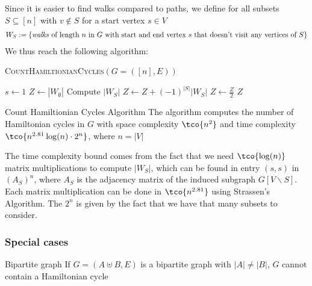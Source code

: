 Since it is easier to find walks compared to paths, we define for all subsets $S \subseteq [n]$ with $v \notin S$ for a start vertex $s \in V$
\begin{align*}
    W_S := \{ \text{\textit{walks} of length $n$ in $G$ with start and end vertex $s$ that doesn't visit any vertices of }S \}
\end{align*}
We thus reach the following algorithm:
\begin{algorithm}
    \caption{\textsc{CountHamiltionianCycles}$(G = ([n], E))$}
    \begin{algorithmic}[1]
        \State $s \gets 1$ 
        \State $Z \gets |W_{\emptyset}|$ 
            \State Compute $|W_S|$ 
            \State $Z \gets Z + (-1)^{|S|}|W_S|$ 
        \EndFor
        \State $Z \gets \frac{Z}{2}$ 
        \State \Return $Z$ 
    \end{algorithmic}
\end{algorithm}

\begin{theorem}[]{Count Hamiltionian Cycles Algorithm}
    The algorithm computes the number of Hamiltonian cycles in $G$ with space complexity $\tco{n^2}$ and time complexity $\tco{n^{2.81}\log(n) \cdot 2^n}$, where $n = |V|$
\end{theorem}
The time complexity bound comes from the fact that we need $\tco{\log(n)}$ matrix multiplications to compute $|W_S|$, which can be found in entry $(s, s)$ in $(A_S)^n$, where $A_S$ is the adjacency matrix of the induced subgraph $G[V\backslash S]$.
Each matrix multiplication can be done in $\tco{n^{2.81}}$ using Strassen's Algorithm.
The $2^n$ is given by the fact that we have that many subsets to consider.


\newpage
\subsubsection{Special cases}
\begin{lemma}[]{Bipartite graph}
    If $G = (A \uplus B, E)$ is a bipartite graph with $|A| \neq |B|$, $G$ cannot contain a Hamiltonian cycle
\end{lemma}

